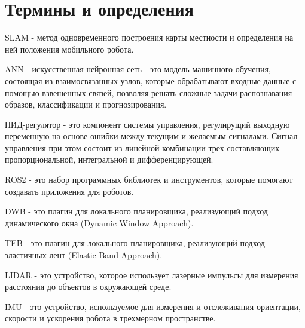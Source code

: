\chapter*{Термины и определения}
\label{ch:definitions}

SLAM - метод одновременного построения карты местности и определения на ней положения мобильного робота.

ANN - искусственная нейронная сеть - это модель машинного обучения, состоящая из взаимосвязанных узлов, которые обрабатывают входные данные с помощью взвешенных связей, позволяя решать сложные задачи распознавания образов, классификации и прогнозирования.

ПИД-регулятор - это компонент системы управления, регулирущий выходную переменную на основе ошибки между текущим и желаемым сигналами. Сигнал управления при этом состоит из линейной комбинации трех составляющих - пропорциональной, интегральной и дифференцирующей.

ROS2 - это набор программных библиотек и инструментов, которые помогают создавать приложения для роботов. 

DWB - это плагин для локального планировщика, реализующий подход динамического окна (Dynamic Window Approach).

TEB - это плагин для локального планировщика, реализующий подход эластичных лент (Elastic Band Approach).

LIDAR - это устройство, которое использует лазерные импульсы для измерения расстояния до объектов в окружающей среде.

IMU - это устройство, используемое для измерения и отслеживания ориентации, скорости и ускорения робота в трехмерном пространстве.

\endinput